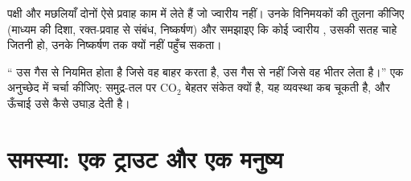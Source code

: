\begin{exercise}[$\star\star\star$]\label{exo:b1:gas-exchange:11}
पक्षी और मछलियाँ दोनों ऐसे प्रवाह काम में लेते हैं जो ज्वारीय नहीं।
उनके विनिमयकों की तुलना कीजिए (माध्यम की दिशा, रक्त-प्रवाह से संबंध,
निष्कर्षण) और समझाइए कि कोई ज्वारीय , उसकी सतह चाहे जितनी हो, उनके
निष्कर्षण तक क्यों नहीं पहुँच सकता।
\end{exercise}

\begin{exercise}[$\star\star\star$]\label{exo:b1:gas-exchange:12}
`` उस गैस से नियमित होता है जिसे वह बाहर करता है, उस गैस से नहीं
जिसे वह भीतर लेता है।'' एक अनुच्छेद में चर्चा कीजिए: समुद्र-तल पर
$\mathrm{CO_2}$ बेहतर संकेत क्यों है, यह व्यवस्था कब चूकती है, और ऊँचाई
उसे कैसे उघाड़ देती है।
\end{exercise}

\section{समस्या: एक ट्राउट और एक मनुष्य}

